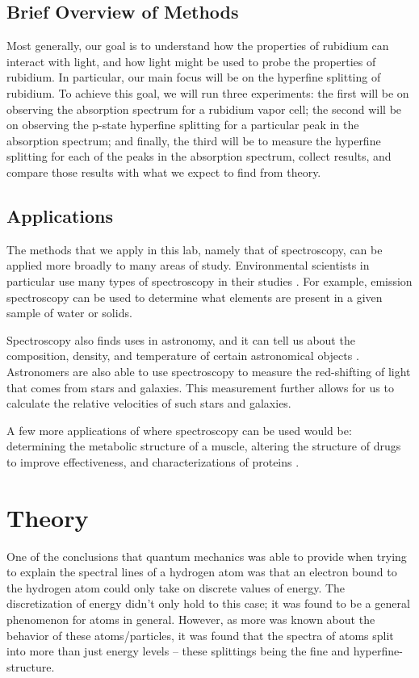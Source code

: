 \documentclass[twocolumn,amsmath,amssymb,pra, floatfix]{revtex4-2}
\begin{document}
\subsection{Brief Overview of Methods}
Most generally, our goal is to understand how the properties of rubidium can interact with light, and how light might be used to probe the properties of rubidium. In particular, our main focus will be on the hyperfine splitting of rubidium. To achieve this goal, we will run three experiments: the first will be on observing the absorption spectrum for a rubidium vapor cell; the second will be on observing the p-state hyperfine splitting for a particular peak in the absorption spectrum; and finally, the third will be to measure the hyperfine splitting for each of the peaks in the absorption spectrum, collect results, and compare those results with what we expect to find from theory.

\subsection{Applications} 
The methods that we apply in this lab, namely that of spectroscopy, can be applied more broadly to many areas of study. Environmental scientists in particular use many types of spectroscopy in their studies \cite{spectroscopy_applications}. For example, emission spectroscopy can be used to determine what elements are present in a given sample of water or solids.

Spectroscopy also finds uses in astronomy, and it can tell us about the composition, density, and temperature of certain astronomical objects \cite{spectroscopy_applications}. Astronomers are also able to use spectroscopy to measure the red-shifting of light that comes from stars and galaxies. This measurement further allows for us to calculate the relative velocities of such stars and galaxies.

A few more applications of where spectroscopy can be used would be: determining the metabolic structure of a muscle, altering the structure of drugs to improve effectiveness, and characterizations of proteins \cite{pasco}.

\section{Theory} 
One of the conclusions that quantum mechanics was able to provide when trying to explain the spectral lines of a hydrogen atom was that an electron bound to the hydrogen atom could only take on discrete values of energy. The discretization of energy didn't only hold to this case; it was found to be a general phenomenon for atoms in general. However, as more was known about the behavior of these atoms/particles, it was found that the spectra of atoms split into more than just energy levels -- these splittings being the fine and hyperfine-structure.
\end{document}
